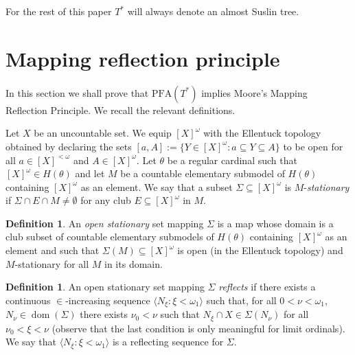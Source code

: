 \documentclass{amsart}
\theoremstyle{definition}
\newtheorem{definition}[theorem]{Definition}
\newcommand{\PFA}{\mathrm{PFA}}
\DeclareMathOperator{\dom}{dom}
\begin{document}
For the rest of this paper $T^{*}$ will always denote an almost Suslin tree.




\section{Mapping reflection principle}\label{sec:mrp}
In this section we shall prove that  $\PFA(T^*)$ implies Moore's Mapping Reflection Principle. We recall the relevant definitions.

Let $X$ be an uncountable set. We equip $[X]^\omega$ with the Ellentuck  topology obtained by declaring the sets $[a,A]:=\{Y\in[X]^\omega : a\subseteq Y\subseteq A\}$ to be open for all $a\in[X]^{<\omega}$ and $A\in[X]^\omega$. Let $\theta$ be a regular cardinal such that $[X]^\omega\in H(\theta)$ and let $M$ be a countable elementary submodel of $H(\theta)$ containing $[X]^\omega$ as an element. We say that a subset $\Sigma\subseteq [X]^\omega$ is $M$-\emph{stationary } if $\Sigma\cap E\cap M\ne\emptyset$ for any club $E\subseteq [X]^\omega$ in $M$.


\begin{definition}
    An \emph{open stationary} set mapping $\Sigma$ is a map whose domain is a club subset of countable elementary submodels of $H(\theta)$ containing $[X]^\omega$ as an element and such that $\Sigma(M)\subseteq [X]^\omega$ is open (in the Ellentuck topology) and $M$-stationary for all $M$ in its domain.
\end{definition}
\begin{definition}
An open stationary set mapping $\Sigma$ \emph{reflects} if there exists a continuous $\in$-increasing sequence  $\langle N_\xi:\xi<\omega_1\rangle $  such that, for all $0<\nu<\omega_1$, $N_\nu\in \dom(\Sigma)$  there exists $\nu_0<\nu $ such that $N_\xi\cap X\in \Sigma(N_\nu)$ for all $\nu_0<\xi<\nu$ (observe that the last condition is only meaningful for limit ordinals). We say that $\langle N_\xi:\xi<\omega_1\rangle $ is a reflecting sequence for $\Sigma$.
\end{definition}
\end{document}
